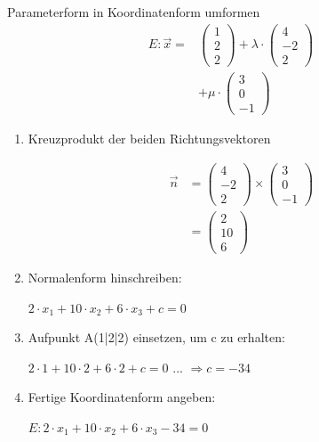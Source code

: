 \documentclass[paper=a6,landscape,ngerman,twoside=true,fontsize=12pt]{scrartcl}
\begin{document}
\begin{frage}
	\LARGE
	Parameterform in Koordinatenform umformen
	\bigskip
	\normalsize
	\begin{align*}
		E:\vec{x}=&\left(\begin{array}{c} 1 \\ 2 \\ 2\end{array} \right)+\lambda \cdot \left(\begin{array}{c} 4 \\ -2 \\ 2\end{array} \right)\\
		&+\mu \cdot \left(\begin{array}{c} 3 \\0 \\ -1\end{array} \right)
	\end{align*}
\end{frage}
\begin{antwort}
	\normalsize
	\begin{enumerate} 
		\item Kreuzprodukt der beiden Richtungsvektoren
		
		\begin{align*}
		\vec{n}&=\left(\begin{array}{c} 4 \\ -2 \\ 2\end{array} \right) \times \left(\begin{array}{c} 3 \\0 \\ -1\end{array} \right) \\
		&=\left(\begin{array}{c} 2 \\10 \\ 6\end{array} \right)
		\end{align*}
		
		\item Normalenform hinschreiben: 
		
		$2 \cdot x_1 + 10 \cdot x_2+6 \cdot x_3 + c = 0$
		
		\item Aufpunkt A(1|2|2) einsetzen, um c zu erhalten: 
		
		$2 \cdot 1 + 10 \cdot 2+6 \cdot 2 + c = 0$
		... $\Rightarrow c = -34$
		
		\item Fertige Koordinatenform angeben: 
		
		$E: 2 \cdot x_1 + 10 \cdot x_2+6 \cdot x_3  -34 = 0$
			
	\end{enumerate} 
	
\end{antwort}
\end{document}
